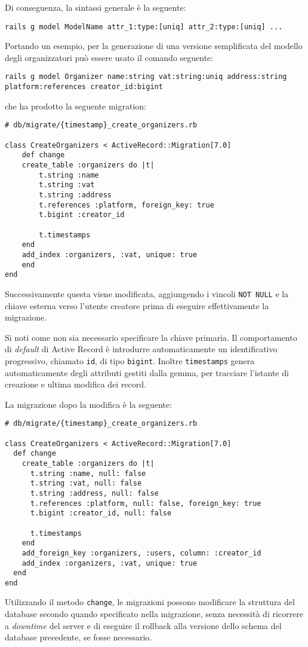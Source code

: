 Di conseguenza, la sintassi generale è la seguente:
\begin{verbatim}
rails g model ModelName attr_1:type:[uniq] attr_2:type:[uniq] ...
\end{verbatim}
Portando un esempio, per la generazione di una versione semplificata del modello degli organizzatori può essere usato il comando seguente:
\begin{verbatim}
rails g model Organizer name:string vat:string:uniq address:string platform:references creator_id:bigint
\end{verbatim}
che ha prodotto la seguente migration:
\begin{verbatim}
# db/migrate/{timestamp}_create_organizers.rb

class CreateOrganizers < ActiveRecord::Migration[7.0]
	def change
	create_table :organizers do |t|
		t.string :name
		t.string :vat
		t.string :address
		t.references :platform, foreign_key: true
		t.bigint :creator_id

		t.timestamps
	end
	add_index :organizers, :vat, unique: true
	end
end
\end{verbatim}
Successivamente questa viene modificata, aggiungendo i vincoli \verb|NOT NULL| e la chiave esterna verso l'utente creatore prima di eseguire effettivamente la migrazione.

Si noti come non sia necessario specificare la chiave primaria. Il comportamento di \emph{default} di Active Record è introdurre automaticamente un identificativo progressivo, chiamato \verb|id|, di tipo \verb|bigint|. Inoltre \verb|timestamps| genera automaticamente degli attributi gestiti dalla gemma, per tracciare l'istante di creazione e ultima modifica dei record.

La migrazione dopo la modifica è la seguente:
\begin{verbatim}
# db/migrate/{timestamp}_create_organizers.rb

class CreateOrganizers < ActiveRecord::Migration[7.0]
  def change
    create_table :organizers do |t|
      t.string :name, null: false
      t.string :vat, null: false
      t.string :address, null: false
      t.references :platform, null: false, foreign_key: true
      t.bigint :creator_id, null: false

      t.timestamps
    end
    add_foreign_key :organizers, :users, column: :creator_id
    add_index :organizers, :vat, unique: true
  end
end
\end{verbatim}
Utilizzando il metodo \verb|change|, le migrazioni possono modificare la struttura del database secondo quando specificato nella migrazione, senza necessità di ricorrere a \emph{downtime} del server e di eseguire il rollback alla versione dello schema del database precedente, se fosse necessario.

